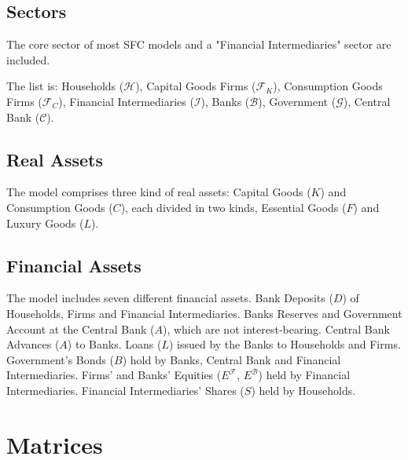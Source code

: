 \documentclass[a4paper, headings=standardclasses]{scrartcl}
\begin{document}
\subsection{Sectors}
The core sector of most SFC models \parencite{nikiforos2017} and a "Financial Intermediaries" sector are included.

The list is: Households ($\mathcal{H}$), Capital Goods Firms ($\mathcal{F}_K$), Consumption Goods Firms ($\mathcal{F}_C$), Financial Intermediaries ($\mathcal{I}$), Banks ($\mathcal{B}$), Government ($\mathcal{G}$), Central Bank ($\mathcal{C}$).
	
\subsection{Real Assets}
The model comprises three kind of real assets: Capital Goods ($K$) and Consumption Goods ($C$), each divided in two kinds, Essential Goods ($F$) and Luxury Goods ($L$).

\subsection{Financial Assets}
The model includes seven different financial assets. 
Bank Deposits ($D$) of Households, Firms and Financial Intermediaries. 
Banks Reserves and Government Account at the Central Bank ($A$), which are not interest-bearing. 
Central Bank Advances ($A$) to Banks.
Loans ($L$) issued by the Banks to Households and Firms. Government's Bonds ($B$) hold by Banks, Central Bank and Financial Intermediaries. 
Firms' and Banks' Equities ($E^\mathcal{F}$, $E^\mathcal{B}$) held by Financial Intermediaries.
Financial Intermediaries' Shares ($S$) held by Households.

\section{Matrices}
\end{document}

